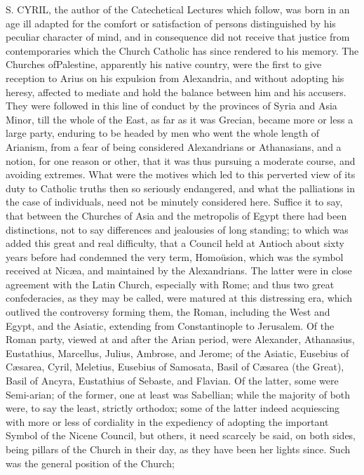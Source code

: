 S. CYRIL,
the author of the Catechetical Lectures which follow, was born in an
age ill adapted for the comfort or satisfaction of persons
distinguished by his peculiar character of mind, and in consequence
did not receive that justice from contemporaries which the Church
Catholic has since rendered to his memory. The Churches of\emph{}Palestine,
apparently his native country, were the first to give reception to
Arius on his expulsion from Alexandria, and without adopting his
heresy, affected to mediate and hold the balance between him and his
accusers. They were followed in this line of conduct by the provinces
of Syria and Asia Minor, till the whole of the East, as far as it was
Grecian, became more or less a large party, enduring to be headed by
men who went the whole length of Arianism, from a fear of being
considered Alexandrians or Athanasians, and a notion, for one reason
or other, that it was thus pursuing a moderate course, and avoiding
extremes. What were the motives which led to this perverted view of
its duty to Catholic truths then so seriously endangered, and what the
palliations in the case of individuals, need not be minutely
considered here. Suffice it to say, that between the Churches of Asia
and the metropolis of Egypt there had been distinctions, not to say
differences and jealousies of long standing; to which was added this
great and real difficulty, that a Council held at Antioch about sixty
years before had condemned the very term, Homoüsion, which was the
symbol received at Nicæa, and maintained by the Alexandrians. The
latter were in close agreement with the Latin Church, especially
with Rome; and thus two great confederacies, as they may be called,
were matured at this distressing era, which outlived the controversy
forming them, the Roman, including the West and Egypt, and the
Asiatic, extending from Constantinople to Jerusalem. Of the Roman
party, viewed at and after the Arian period, were Alexander,
Athanasius, Eustathius, Marcellus, Julius, Ambrose, and Jerome; of the
Asiatic, Eusebius of Cæsarea, Cyril, Meletius, Eusebius of Samosata,
Basil of Cæsarea (the Great), Basil of Ancyra, Eustathius of Sebaste,
and Flavian. Of the latter, some were Semi-arian; of the former, one
at least was Sabellian; while the majority of both were, to say the
least, strictly orthodox; some of the latter indeed acquiescing with
more or less of cordiality in the expediency of adopting the important
Symbol of the Nicene Council, but others, it need scarcely be said, on
both sides, being pillars of the Church in their day, as they have
been her lights since. Such was the general position of the Church;
